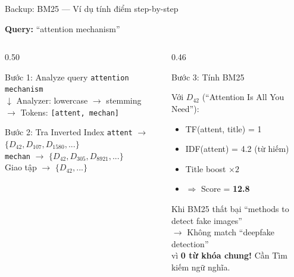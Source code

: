 \documentclass[aspectratio=169, 11pt]{beamer}
\begin{document}
\begin{frame}{Backup: BM25 --- Ví dụ tính điểm step-by-step}

\textbf{Query:} ``attention mechanism'' 

\vspace{0.3cm}

\begin{columns}[T]
\begin{column}{0.50\textwidth}

\begin{block}{Bước 1: Analyze query}
{\scriptsize
\texttt{attention mechanism}\\
$\downarrow$ Analyzer: lowercase $\to$ stemming\\
$\to$ Tokens: \texttt{[attent, mechan]}
}
\end{block}

\begin{block}{Bước 2: Tra Inverted Index}
{\scriptsize
\texttt{attent} $\to$ $\{D_{42}, D_{107}, D_{1580}, ...\}$\\
\texttt{mechan} $\to$ $\{D_{42}, D_{305}, D_{8921}, ...\}$\\
Giao tập $\to$ $\{D_{42}, ...\}$
}
\end{block}

\end{column}
\begin{column}{0.46\textwidth}

\begin{exampleblock}{Bước 3: Tính BM25}
{\scriptsize Với $D_{42}$ (``Attention Is All You Need''):
\begin{itemize}
    \item TF(attent, title) = 1
    \item IDF(attent) = 4.2 {\tiny(từ hiếm)}
    \item Title boost $\times 2$
    \item $\Rightarrow$ Score = \textbf{12.8}
\end{itemize}
}
\end{exampleblock}

\vspace{0.15cm}

\begin{alertblock}{Khi BM25 thất bại}
{\scriptsize ``methods to detect fake images'' \\
$\to$ Không match ``deepfake detection'' \\
vì \textbf{0 từ khóa chung!} Cần Tìm kiếm ngữ nghĩa.}
\end{alertblock}

\end{column}
\end{columns}
\end{frame}
\end{document}
